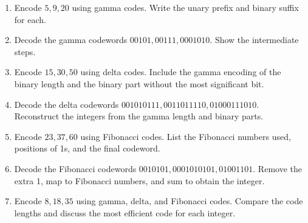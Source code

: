 \documentclass{subfiles}
\begin{document}
    \begin{exercises*}
        \begin{enumerate}
            \item Encode \(5, 9, 20\) using gamma codes. Write the unary prefix 
                  and binary suffix for each.

            \item Decode the gamma codewords \(00101, 00111, 0001010\). Show the 
                  intermediate steps.

            \item Encode \(15, 30, 50\) using delta codes. Include the gamma 
                  encoding of the binary length and the binary part without the 
                  most significant bit.

            \item Decode the delta codewords \(001010 111, 001101 1110, 010001 11010\). 
                  Reconstruct the integers from the gamma length and binary parts.

            \item Encode \(23, 37, 60\) using Fibonacci codes. List the Fibonacci 
                  numbers used, positions of 1s, and the final codeword.

            \item Decode the Fibonacci codewords \(0010101, 0001010101, 01001101\). 
                  Remove the extra 1, map to Fibonacci numbers, and sum to obtain 
                  the integer.

            \item Encode \(8, 18, 35\) using gamma, delta, and Fibonacci codes. 
                  Compare the code lengths and discuss the most efficient code 
                  for each integer.
        \end{enumerate}
    \end{exercises*}
    \cleardoublepage
\end{document}
